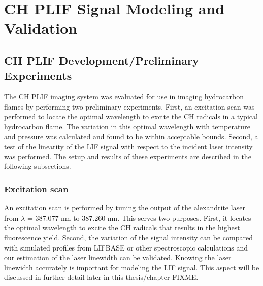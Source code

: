 \chapter{CH PLIF Signal Modeling and Validation}






\section{CH PLIF Development/Preliminary Experiments}

The CH PLIF imaging system was evaluated for use in imaging hydrocarbon flames by performing two preliminary experiments.
First, an excitation scan was performed to locate the optimal wavelength to excite the CH radicals in a typical hydrocarbon flame.
The variation in this optimal wavelength with temperature and pressure was calculated and found to be within acceptable bounds.
Second, a test of the linearity of the LIF signal with respect to the incident laser intensity was performed.
The setup and results of these experiments are described in the following subsections.

\subsection{Excitation scan}
\label{sec:excitationscan}

An excitation scan is performed by tuning the output of the alexandrite laser from \(\lambda\) = 387.077 nm to 387.260 nm.
This serves two purposes.
First, it locates the optimal wavelength to excite the CH radicals that results in the highest fluorescence yield.
Second, the variation of the signal intensity can be compared with simulated profiles from LIFBASE or other spectroscopic calculations and our estimation of the laser linewidth can be validated.
Knowing the laser linewidth accurately is important for modeling the LIF signal.
This aspect will be discussed in further detail later in this thesis/chapter FIXME.

